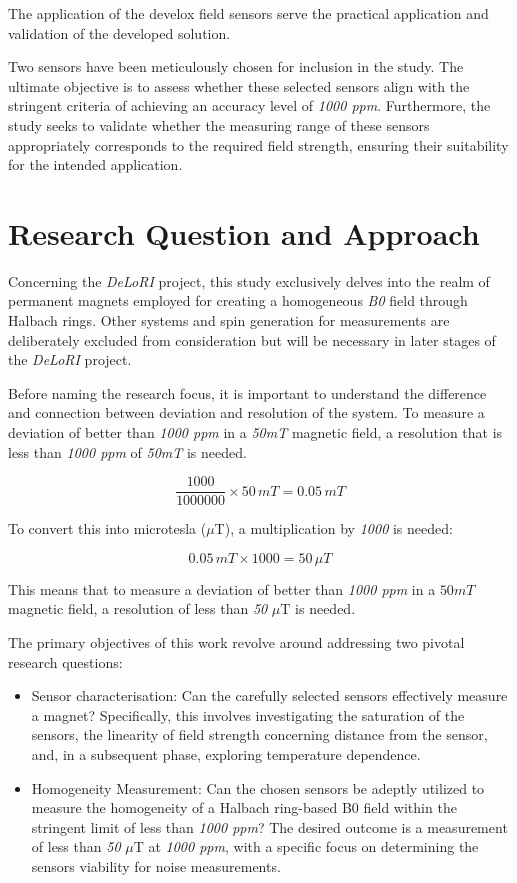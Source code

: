 The application of the develox field sensors serve the practical
application and validation of the developed solution.

Two sensors have been meticulously chosen for inclusion in the study.
The ultimate objective is to assess whether these selected sensors align
with the stringent criteria of achieving an accuracy level of \emph{1000
\gls{ppm}}. Furthermore, the study seeks to validate whether the
measuring range of these sensors appropriately corresponds to the
required field strength, ensuring their suitability for the intended
application.

\hypertarget{research-question-and-approach}{%
\section{Research Question and
Approach}\label{research-question-and-approach}}

Concerning the \emph{DeLoRI} project, this study exclusively delves into
the realm of permanent magnets employed for creating a homogeneous
\emph{B0} field through Halbach rings. Other systems and spin generation
for measurements are deliberately excluded from consideration but will
be necessary in later stages of the \emph{DeLoRI} project.

Before naming the research focus, it is important to understand the
difference and connection between deviation and resolution of the
system. To measure a deviation of better than \emph{1000 \gls{ppm}} in a
\emph{50mT} magnetic field, a resolution that is less than \emph{1000
\gls{ppm}} of \emph{50mT} is needed.

\[\frac{1000}{1000000} \times 50 \, mT = 0.05 \, mT \]

To convert this into microtesla (\(\mu\)T), a multiplication by
\emph{1000} is needed:

\[ 0.05 \, mT \times 1000 = 50 \, \mu T \]

This means that to measure a deviation of better than \emph{1000
\gls{ppm}} in a \(50mT\) magnetic field, a resolution of less than
\emph{50} \(\mu\)T is needed.

The primary objectives of this work revolve around addressing two
pivotal research questions:

\begin{itemize}
\item
  Sensor characterisation: Can the carefully selected sensors
  effectively measure a magnet? Specifically, this involves
  investigating the saturation of the sensors, the linearity of field
  strength concerning distance from the sensor, and, in a subsequent
  phase, exploring temperature dependence.
\item
  Homogeneity Measurement: Can the chosen sensors be adeptly utilized to
  measure the homogeneity of a Halbach ring-based B0 field within the
  stringent limit of less than \emph{1000 \gls{ppm}}? The desired
  outcome is a measurement of less than \emph{50} \(\mu\)T at \emph{1000
  \gls{ppm}}, with a specific focus on determining the sensors viability
  for noise measurements.
\end{itemize}

